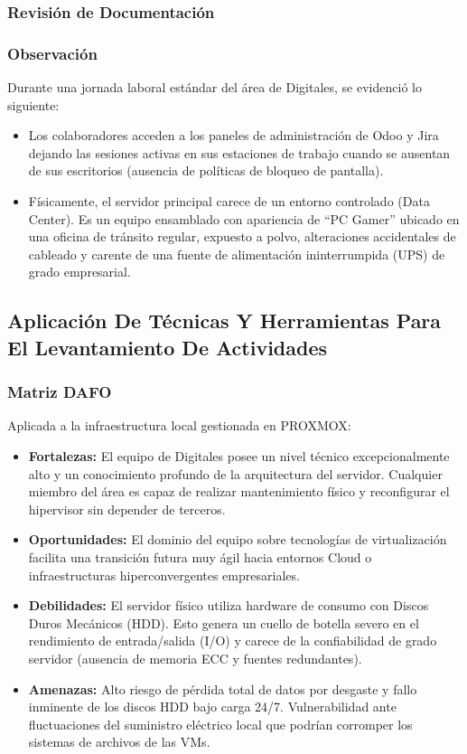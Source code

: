 \documentclass[12pt]{article}
\begin{document}
\subsubsection{Revisión de Documentación}

\subsubsection{Observación}
Durante una jornada laboral estándar del área de Digitales, se evidenció lo siguiente:
\begin{itemize}
    \item Los colaboradores acceden a los paneles de administración de Odoo y Jira dejando las sesiones activas en sus estaciones de trabajo cuando se ausentan de sus escritorios (ausencia de políticas de bloqueo de pantalla).
    \item Físicamente, el servidor principal carece de un entorno controlado (Data Center). Es un equipo ensamblado con apariencia de ``PC Gamer'' ubicado en una oficina de tránsito regular, expuesto a polvo, alteraciones accidentales de cableado y carente de una fuente de alimentación ininterrumpida (UPS) de grado empresarial.
\end{itemize}

\subsection{Aplicación De Técnicas Y Herramientas Para El Levantamiento De Actividades}
\subsubsection{Matriz DAFO}
Aplicada a la infraestructura local gestionada en PROXMOX:
\begin{itemize}
    \item \textbf{Fortalezas:} El equipo de Digitales posee un nivel técnico excepcionalmente alto y un conocimiento profundo de la arquitectura del servidor. Cualquier miembro del área es capaz de realizar mantenimiento físico y reconfigurar el hipervisor sin depender de terceros.
    \item \textbf{Oportunidades:} El dominio del equipo sobre tecnologías de virtualización facilita una transición futura muy ágil hacia entornos Cloud o infraestructuras hiperconvergentes empresariales.
    \item \textbf{Debilidades:} El servidor físico utiliza hardware de consumo con Discos Duros Mecánicos (HDD). Esto genera un cuello de botella severo en el rendimiento de entrada/salida (I/O) y carece de la confiabilidad de grado servidor (ausencia de memoria ECC y fuentes redundantes).
    \item \textbf{Amenazas:} Alto riesgo de pérdida total de datos por desgaste y fallo inminente de los discos HDD bajo carga 24/7. Vulnerabilidad ante fluctuaciones del suministro eléctrico local que podrían corromper los sistemas de archivos de las VMs.
\end{itemize}
\end{document}
